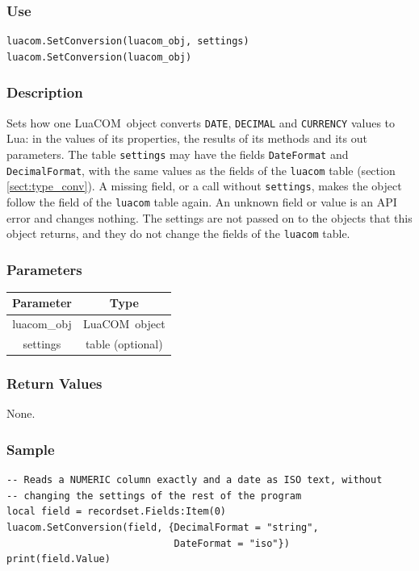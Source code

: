 \documentclass[11pt,a4paper,english]{report}
\newcommand{\ident}[1]{\mbox{\texttt{#1}}}
\newcommand{\techname}[1]{\mbox{#1}}
\newcommand{\lua}{\techname{Lua}}
\newcommand{\luacom}{\techname{LuaCOM}}
\begin{document}
\subsubsection*{Use}

\begin{verbatim}
luacom.SetConversion(luacom_obj, settings)
luacom.SetConversion(luacom_obj)
\end{verbatim}

\subsubsection*{Description}
Sets how one \luacom\ object converts \ident{DATE}, \ident{DECIMAL}
and \ident{CURRENCY} values to \lua: in the values of its properties,
the results of its methods and its out parameters. The table
\verb+settings+ may have the fields \verb+DateFormat+ and
\verb+DecimalFormat+, with the same values as the fields of the
\verb+luacom+ table (section \ref{sect:type_conv}). A missing field,
or a call without \verb+settings+, makes the object follow the field
of the \verb+luacom+ table again. An unknown field or value is an API
error and changes nothing. The settings are not passed on to the
objects that this object returns, and they do not change the fields of
the \verb+luacom+ table.

\subsubsection*{Parameters}
\begin{tabular}{|c|c|}
\hline
\bf Parameter & \bf Type  \\ \hline \hline
luacom\_obj & \luacom\ object  \\ \hline
settings & table (optional)  \\ \hline
\end{tabular}

\subsubsection*{Return Values}

None.

\subsubsection*{Sample}

\begin{verbatim}
-- Reads a NUMERIC column exactly and a date as ISO text, without
-- changing the settings of the rest of the program
local field = recordset.Fields:Item(0)
luacom.SetConversion(field, {DecimalFormat = "string",
                             DateFormat = "iso"})
print(field.Value)
\end{verbatim}
\end{document}
